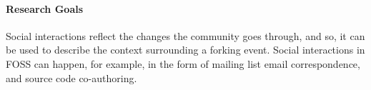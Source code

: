 \documentclass[12pt]{report}
\begin{document}
\paragraph*{Research Goals}
\label{ResearchGoals}
\label{ResearchObjective}

Social interactions reflect the changes the community goes through, and so, it can be used to describe the context surrounding a forking event. Social interactions in FOSS can happen, for example, in the form of mailing list email correspondence, and source code co-authoring. 

%
%

\end{document}
